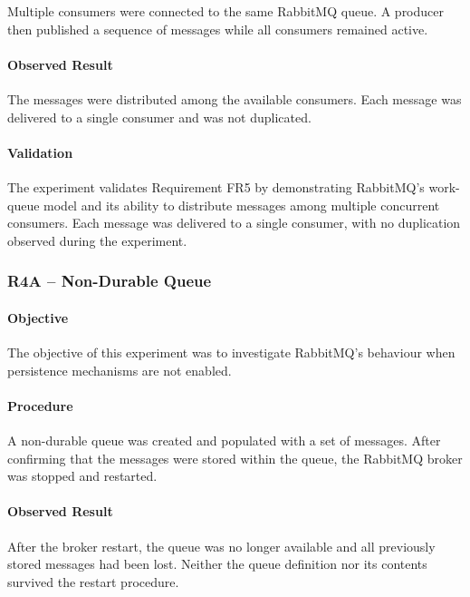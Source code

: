 \documentclass{scrartcl}
\begin{document}
Multiple consumers were connected to the same RabbitMQ queue. A producer then published a sequence of messages while all consumers remained active.

\paragraph{Observed Result}

The messages were distributed among the available consumers. Each message was delivered to a single consumer and was not duplicated.

\paragraph{Validation}

The experiment validates Requirement FR5 by demonstrating RabbitMQ's work-queue model and its ability to distribute messages among multiple concurrent consumers. Each message was delivered to a single consumer, with no duplication observed during the experiment.

\subsubsection{R4A -- Non-Durable Queue}

\paragraph{Objective}

The objective of this experiment was to investigate RabbitMQ's behaviour when persistence mechanisms are not enabled.

\paragraph{Procedure}

A non-durable queue was created and populated with a set of messages. After confirming that the messages were stored within the queue, the RabbitMQ broker was stopped and restarted.

\paragraph{Observed Result}

After the broker restart, the queue was no longer available and all previously stored messages had been lost. Neither the queue definition nor its contents survived the restart procedure.
\end{document}
